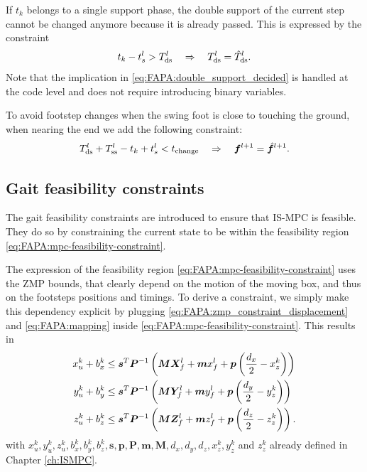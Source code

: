 If $t_k$ belongs to a single support phase, the double support of the current
step cannot be changed anymore because it is already passed. This is expressed
by the constraint
\begin{equation}
	t_k - t_s^l > T^l_{\rm{ds}} \quad \Rightarrow \quad  T^l_{\rm{ds}} = \hat T^l_{\rm{ds}}.
	\label{eq:FAPA:double_support_decided}
\end{equation}
Note that the implication in \eqref{eq:FAPA:double_support_decided} is handled
at the code level and does not require introducing binary variables.

To avoid footstep changes when the swing foot is close to touching the ground,
when nearing the end we add the following constraint:
\begin{equation}
    \label{eq:FAPA:swing_foot_constraint}
	T^l_{\rm ds} + T^l_{\rm ss} - t_k + t_s^l < t_{\mathrm{change}} \quad \Rightarrow \quad
	{\bm{f}}^{l+1} = \hat{{\bm{f}}}^{l+1}.
\end{equation}

\subsection{Gait feasibility constraints}
The gait feasibility constraints are introduced to ensure that IS-MPC is
feasible. They do so by constraining the current state to be within the
feasibility region \eqref{eq:FAPA:mpc-feasibility-constraint}.

The expression of the feasibility region
\eqref{eq:FAPA:mpc-feasibility-constraint} uses the ZMP bounds, that clearly
depend on the motion of the moving box, and thus on the footsteps positions
and timings. To derive a constraint, we simply make this dependency explicit
by plugging \eqref{eq:FAPA:zmp_constraint_displacement} and
\eqref{eq:FAPA:mapping} inside \eqref{eq:FAPA:mpc-feasibility-constraint}.
This results in
\begin{equation}
    \label{eq:FAPA:gait_feasibility_constraint}
    \begin{aligned}
        x_u^k + b_x^k &\le \bm{s}^T \bm{P}^{-1} \left({\bm{M}}{\bm{X}}_f^l + {\bm{m}} x_f^l + \bm{p} \left(\frac{d_x}{2} - x_z^k\right)\right) \\
        y_u^k + b_y^k &\le \bm{s}^T \bm{P}^{-1} \left({\bm{M}}{\bm{Y}}_f^l + {\bm{m}} y_f^l + \bm{p} \left(\frac{d_y}{2} - y_z^k\right)\right) \\
        z_u^k + b_z^k &\le \bm{s}^T \bm{P}^{-1} \left({\bm{M}}{\bm{Z}}_f^l + {\bm{m}} z_f^l + \bm{p} \left(\frac{d_z}{2} - z_z^k\right)\right).
    \end{aligned}
\end{equation}
with $x_u^k, y_u^k, z_u^k, b_x^k, b_y^k, b_z^k, \bm{s}, \bm{p}, \bm{P}, \bm{m}, \bm{M}, d_x, d_y, d_z, x_z^k, y_z^k$ and $z_z^k$
already defined in Chapter \ref{ch:ISMPC}.

